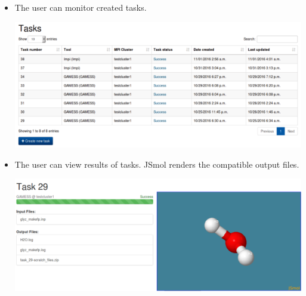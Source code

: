 \begin{itemize}
		\item The user can monitor created tasks. \newline
		\begin{center}			
			\includegraphics[scale=0.40]{./images/tasks_list_view_2.png}			
		\end{center}	
		\item The user can view results of tasks. JSmol renders the compatible output files\cite{IJCH:IJCH201300024}. \newline
		\begin{center}			
			\includegraphics[scale=0.35]{./images/jsmol_detail_view_2.png}			
		\end{center}	

		    
		
	\end{itemize}
	
